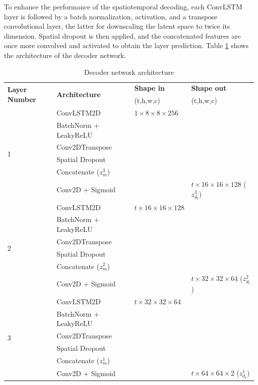 \documentclass[10pt, twoside]{article}
\begin{document}
To enhance the performance of the spatiotemporal decoding, each ConvLSTM layer is followed by a batch normalization, activation, and a transpose convolutional layer, the latter for downscaling the latent space to twice its dimension. Spatial dropout is then applied, and the concatenated features are once more convolved and activated to obtain the layer prediction. Table \ref{tab2} shows the architecture of the decoder network.

\begin{table}[t]
    \caption{Decoder network architecture}\label{tab2}
    \centering
    \begin{tabular}{@{} llll @{} }
    \toprule
        \multirow{2}{*}{\textbf{Layer Number}} & \multirow{2}{*}{\textbf{Architecture}} &
        \textbf{Shape in} & \textbf{Shape out} \\ & & (t,h,w,c) & (t,h,w,c) \\
    \midrule
        \multirow{6}{*}{1} & ConvLSTM2D & $1\times8\times8\times256$ & \\
                           & BatchNorm + LeakyReLU & & \\
                           & Conv2DTranspose       & & \\
                           & Spatial Dropout       & & \\
                           & Concatenate ($z_m^3$) & & \\
                           & Conv2D + Sigmoid      & & $t\times16\times16\times128$ ($z_{d_t}^3$) \\
        \hline                      
        \multirow{6}{*}{2} & ConvLSTM2D & $t\times16\times16\times128$ & \\
                           & BatchNorm + LeakyReLU & & \\
                           & Conv2DTranspose       & & \\
                           & Spatial Dropout       & & \\
                           & Concatenate ($z_m^2$) & & \\
                           & Conv2D + Sigmoid      & & $t\times32\times32\times64$ ($z_{d_t}^2$) \\
        \hline
        \multirow{6}{*}{3} & ConvLSTM2D & $t\times32\times32\times64$ & \\
                           & BatchNorm + LeakyReLU & & \\
                           & Conv2DTranspose       & & \\
                           & Spatial Dropout       & & \\
                           & Concatenate ($z_m^1$) & & \\
                           & Conv2D + Sigmoid      & & $t\times64\times64\times2$ ($z_{d_t}^1$) \\
    \bottomrule
    \end{tabular}
\end{table}
\end{document}
